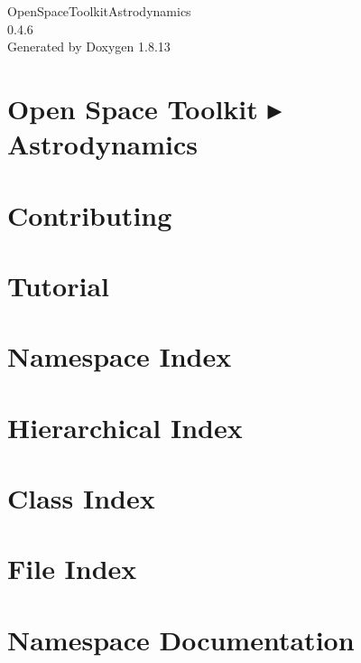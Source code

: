 \documentclass[twoside]{book}
\newcommand{\+}{\discretionary{\mbox{\scriptsize$\hookleftarrow$}}{}{}}
\newcommand{\clearemptydoublepage}{%
  \newpage{\pagestyle{empty}\cleardoublepage}%
}
\begin{document}
\hypersetup{pageanchor=false,
             bookmarksnumbered=true,
             pdfencoding=unicode
            }
\begin{titlepage}
\vspace*{7cm}
\begin{center}%
{\Large Open\+Space\+Toolkit\+Astrodynamics \\[1ex]\large 0.\+4.\+6 }\\
\vspace*{1cm}
{\large Generated by Doxygen 1.8.13}\\
\end{center}
\end{titlepage}
\clearemptydoublepage
{}
\tableofcontents
\clearemptydoublepage
{}
\hypersetup{pageanchor=true}

\chapter{Open Space Toolkit ▸ Astrodynamics}
\label{index}\hypertarget{index}{}
\chapter{Contributing}
\label{md__c_o_n_t_r_i_b_u_t_i_n_g}

\chapter{Tutorial}
\label{md_docs__tutorial}

\chapter{Namespace Index}

\chapter{Hierarchical Index}

\chapter{Class Index}

\chapter{File Index}

\chapter{Namespace Documentation}











\end{document}
